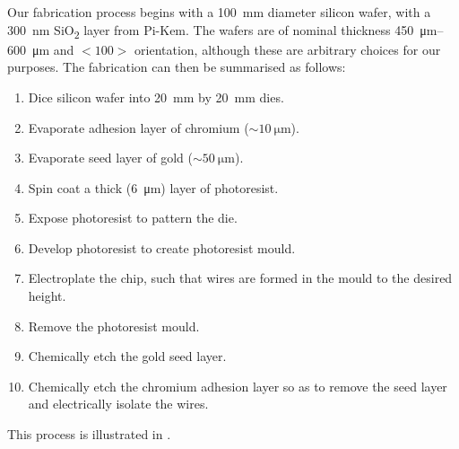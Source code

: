 Our fabrication process begins with a \SI{100}{\milli\meter} diameter silicon
wafer, with a \SI{300}{\nano\meter} SiO\textsubscript{2} layer from Pi-Kem. The
wafers are of nominal thickness \SIrange{450}{600}{\micro\meter} and $<100>$
orientation, although these are arbitrary choices for our purposes. The
fabrication can then be summarised as follows:
%
\begin{enumerate}
  \item Dice silicon wafer into \SI{20}{\milli\meter} by \SI{20}{\milli\meter}
    dies.
  \item Evaporate adhesion layer of chromium ($\sim\SI{10}{\micro\meter}$).
  \item Evaporate seed layer of gold ($\sim\SI{50}{\micro\meter}$).
  \item Spin coat a thick (\SI{6}{\micro\meter}) layer of photoresist.
  \item Expose photoresist to pattern the die.
  \item Develop photoresist to create photoresist mould.
  \item Electroplate the chip, such that wires are formed in the mould to the
    desired height.
  \item Remove the photoresist mould.
  \item Chemically etch the gold seed layer.
  \item Chemically etch the chromium adhesion layer so as to remove the seed
    layer and electrically isolate the wires.
\end{enumerate}
%
This process is illustrated in .

